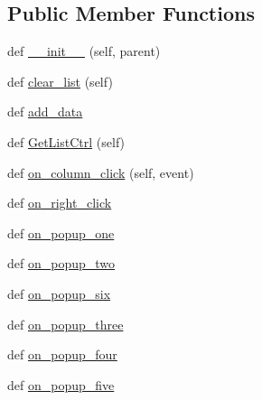 \subsection*{Public Member Functions}
\begin{DoxyCompactItemize}
\item 
def \hyperlink{class_uni_dec_1_1unidec__modules_1_1peaklistsort_1_1_peak_list_ctrl_panel_abede59c991e75d65ed6cbbf1e9fc066b}{\+\_\+\+\_\+init\+\_\+\+\_\+} (self, parent)
\item 
def \hyperlink{class_uni_dec_1_1unidec__modules_1_1peaklistsort_1_1_peak_list_ctrl_panel_a5299d09b08eddf5d0c0c28ad19676981}{clear\+\_\+list} (self)
\item 
def \hyperlink{class_uni_dec_1_1unidec__modules_1_1peaklistsort_1_1_peak_list_ctrl_panel_a0880c0d3b5c441ff3b022aece2640d29}{add\+\_\+data}
\item 
def \hyperlink{class_uni_dec_1_1unidec__modules_1_1peaklistsort_1_1_peak_list_ctrl_panel_a2fc0445cd7bde16ee70c96f285a3a02e}{Get\+List\+Ctrl} (self)
\item 
def \hyperlink{class_uni_dec_1_1unidec__modules_1_1peaklistsort_1_1_peak_list_ctrl_panel_a43b653389921bd68876c2332f1eaef54}{on\+\_\+column\+\_\+click} (self, event)
\item 
def \hyperlink{class_uni_dec_1_1unidec__modules_1_1peaklistsort_1_1_peak_list_ctrl_panel_a181c0f37cebc1ba74d044d329dbe298f}{on\+\_\+right\+\_\+click}
\item 
def \hyperlink{class_uni_dec_1_1unidec__modules_1_1peaklistsort_1_1_peak_list_ctrl_panel_a8d69d1bdc75b3aa705582c54e56af404}{on\+\_\+popup\+\_\+one}
\item 
def \hyperlink{class_uni_dec_1_1unidec__modules_1_1peaklistsort_1_1_peak_list_ctrl_panel_aa88434d6052b4fdd3bf0c9e97c5b504a}{on\+\_\+popup\+\_\+two}
\item 
def \hyperlink{class_uni_dec_1_1unidec__modules_1_1peaklistsort_1_1_peak_list_ctrl_panel_a4ae46885377d72073d7474d7c9b22735}{on\+\_\+popup\+\_\+six}
\item 
def \hyperlink{class_uni_dec_1_1unidec__modules_1_1peaklistsort_1_1_peak_list_ctrl_panel_acb26273b1c2bfb683be3ea99ade3b9e6}{on\+\_\+popup\+\_\+three}
\item 
def \hyperlink{class_uni_dec_1_1unidec__modules_1_1peaklistsort_1_1_peak_list_ctrl_panel_a9077cd195a0a58968654c3dd0b457f91}{on\+\_\+popup\+\_\+four}
\item 
def \hyperlink{class_uni_dec_1_1unidec__modules_1_1peaklistsort_1_1_peak_list_ctrl_panel_a4298ce86491b7783e03205283cb959d5}{on\+\_\+popup\+\_\+five}
\end{DoxyCompactItemize}

